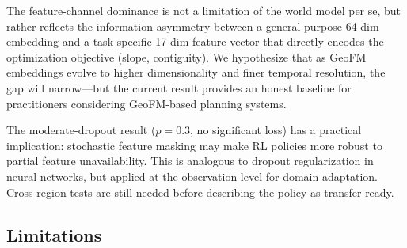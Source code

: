 \documentclass{article}
\begin{document}
The feature-channel dominance is not a limitation of the world model per se, but rather reflects the information asymmetry between a general-purpose 64-dim embedding and a task-specific 17-dim feature vector that directly encodes the optimization objective (slope, contiguity). We hypothesize that as GeoFM embeddings evolve to higher dimensionality and finer temporal resolution, the gap will narrow---but the current result provides an honest baseline for practitioners considering GeoFM-based planning systems.

The moderate-dropout result ($p=0.3$, no significant loss) has a practical implication: stochastic feature masking may make RL policies more robust to partial feature unavailability. This is analogous to dropout regularization in neural networks, but applied at the observation level for domain adaptation. Cross-region tests are still needed before describing the policy as transfer-ready.

\subsection{Limitations}
\label{sec:limitations}
\end{document}
